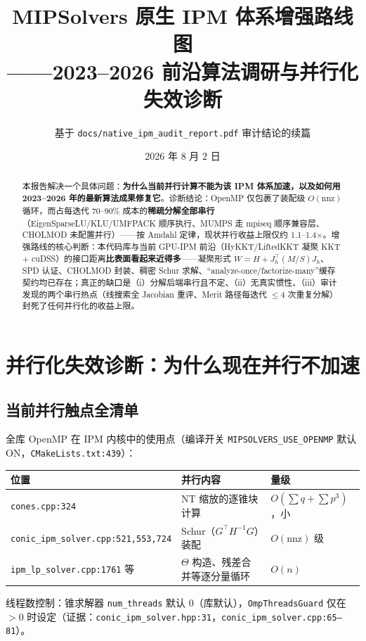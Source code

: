 \documentclass[11pt,a4paper]{ctexart}
\title{\textbf{MIPSolvers 原生 IPM 体系增强路线图\\——2023--2026 前沿算法调研与并行化失效诊断}}
\author{基于 \texttt{docs/native\_ipm\_audit\_report.pdf} 审计结论的续篇}
\date{2026 年 8 月 2 日}
\newcommand{\file}[1]{\texttt{#1}}
\newcommand{\func}[1]{\texttt{#1}}
\newcommand{\opt}[1]{\texttt{#1}}
\newcommand{\evid}[1]{{\footnotesize\color{black!70}（证据：#1）}}
\begin{document}
\maketitle

\begin{abstract}
\noindent 本报告解决一个具体问题：\textbf{为什么当前并行计算不能为该 IPM 体系加速，以及如何用 2023--2026 年的最新算法成果修复它}。诊断结论：OpenMP 仅包裹了装配级 $O(\mathrm{nnz})$ 循环，而占每迭代 70--90\% 成本的\textbf{稀疏分解全部串行}（EigenSparseLU/KLU/UMFPACK 顺序执行、MUMPS 走 mpiseq 顺序兼容层、CHOLMOD 未配置并行）——按 Amdahl 定律，现状并行收益上限仅约 1.1--1.4$\times$。增强路线的核心判断：本代码库与当前 GPU-IPM 前沿（HyKKT/LiftedKKT 凝聚 KKT + cuDSS）的接口距离\textbf{比表面看起来近得多}——凝聚形式 $W=H+J_h^{\top}(M/S)J_h$、SPD 认证、CHOLMOD 封装、稠密 Schur 求解、``analyze-once/factorize-many''缓存契约均已存在；真正的缺口是（i）分解后端串行且不定、（ii）无真实惯性、（iii）审计发现的两个串行热点（线搜索全 Jacobian 重评、Merit 路径每迭代 $\le 4$ 次重复分解）封死了任何并行化的收益上限。
\end{abstract}

\tableofcontents

\section{并行化失效诊断：为什么现在并行不加速}

\subsection{当前并行触点全清单}
全库 OpenMP 在 IPM 内核中的使用点（编译开关 \opt{MIPSOLVERS\_USE\_OPENMP} 默认 ON，\file{CMakeLists.txt:439}）：
\begin{center}\footnotesize
\begin{tabular}{@{}lll@{}}
\toprule
位置 & 并行内容 & 量级 \\
\midrule
\file{cones.cpp:324} & NT 缩放的逐锥块计算 & $O(\sum q + \sum p^3)$，小 \\
\file{conic\_ipm\_solver.cpp:521,553,724} & Schur（$G^{\top}H^{-1}G$）装配 & $O(\mathrm{nnz})$ 级 \\
\file{ipm\_lp\_solver.cpp:1761} 等 & $\Theta$ 构造、残差合并等逐分量循环 & $O(n)$ \\
\bottomrule
\end{tabular}
\end{center}
线程数控制：锥求解器 \opt{num\_threads} 默认 0（库默认），\func{OmpThreadsGuard} 仅在 $>0$ 时设定\evid{\file{conic\_ipm\_solver.hpp:31}，\file{conic\_ipm\_solver.cpp:65--81}}。
\end{document}
